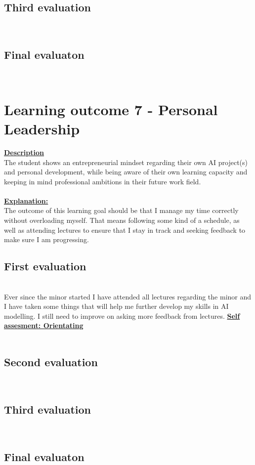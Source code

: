 \documentclass{article}
\begin{document}
\subsection{Third evaluation}\\
\subsection{Final evaluaton}\\

\section{Learning outcome 7 - Personal Leadership}
\underline{\textbf{Description}}\\
The student shows an entrepreneurial mindset regarding their own AI project(s) and personal development, while being aware
of their own learning capacity and keeping in mind professional ambitions in their future work field.\\\\
\underline{\textbf{Explanation:}}\\
The outcome of this learning goal should be that I manage my time correctly without overloading myself. That means following some kind of a schedule, 
as well as attending lectures to ensure that I stay in track and seeking feedback to make sure I am progressing.
\subsection{First evaluation}\\
Ever since the minor started I have attended all lectures regarding the minor and I have taken some things that will help me further develop my skills in AI modelling. 
I still need to improve on asking more feedback from lectures.
\underline{\textbf{Self assesment: Orientating}}\\\\
\subsection{Second evaluation}\\
\subsection{Third evaluation}\\
\subsection{Final evaluaton}\\
\end{document}
